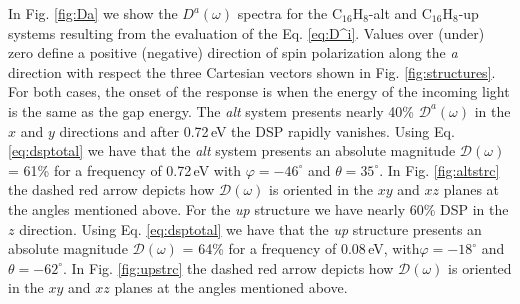 \documentclass[pss]{wiley2sp} %
\begin{document}
In Fig. \ref{fig:Da} we show the $D^{a}(\omega)$ spectra for the
C$_{16}$H$_{8}$-alt and C$_{16}$H$_{8}$-up systems resulting from the
evaluation of the Eq. \eqref{eq:D^i}. Values over (under) zero define a
positive (negative) direction of spin polarization along the \emph{a}
direction with respect the three Cartesian vectors shown in Fig.
\ref{fig:structures}. For both cases, the onset of the response is when the
energy of the incoming light is the same as the gap energy. The \emph{alt}
system presents nearly 40\% $\mathcal{D}^{a}(\omega)$ in the $x$ and $y$
directions and after 0.72\,eV the DSP rapidly vanishes. Using Eq.
\eqref{eq:dsptotal} we have that the \emph{alt} system presents an absolute
magnitude $\mathcal{D}(\omega)$ = 61\% for a frequency of 0.72\,eV with
$\varphi = -46^{\circ}$ and $\theta=35^{\circ}$. In Fig. \ref{fig:altstrc} the
dashed red arrow depicts how $\mathcal{D}(\omega)$ is oriented in the $xy$ and
$xz$ planes at the angles mentioned above. For the
\emph{up} structure we have nearly 60\% DSP in the $z$ direction. Using Eq.
\eqref{eq:dsptotal} we have that the \emph{up} structure presents an absolute
magnitude $\mathcal{D}(\omega)$ = 64\% for a frequency of 0.08\,eV,
with$\varphi = -18^{\circ}$ and $\theta = -62^{\circ}$. In Fig.
\ref{fig:upstrc} the dashed red arrow depicts how $\mathcal{D}(\omega)$ is
oriented in the $xy$ and $xz$ planes at the angles mentioned above.
\end{document}
